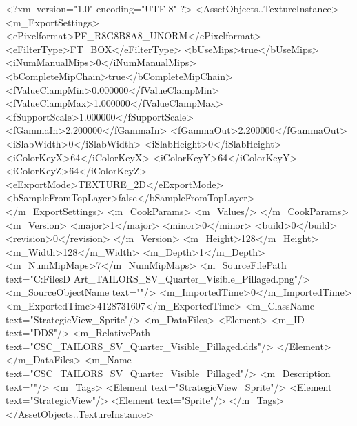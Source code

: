 <?xml version="1.0" encoding="UTF-8" ?>
<AssetObjects..TextureInstance>
	<m_ExportSettings>
		<ePixelformat>PF_R8G8B8A8_UNORM</ePixelformat>
		<eFilterType>FT_BOX</eFilterType>
		<bUseMips>true</bUseMips>
		<iNumManualMips>0</iNumManualMips>
		<bCompleteMipChain>true</bCompleteMipChain>
		<fValueClampMin>0.000000</fValueClampMin>
		<fValueClampMax>1.000000</fValueClampMax>
		<fSupportScale>1.000000</fSupportScale>
		<fGammaIn>2.200000</fGammaIn>
		<fGammaOut>2.200000</fGammaOut>
		<iSlabWidth>0</iSlabWidth>
		<iSlabHeight>0</iSlabHeight>
		<iColorKeyX>64</iColorKeyX>
		<iColorKeyY>64</iColorKeyY>
		<iColorKeyZ>64</iColorKeyZ>
		<eExportMode>TEXTURE_2D</eExportMode>
		<bSampleFromTopLayer>false</bSampleFromTopLayer>
	</m_ExportSettings>
	<m_CookParams>
		<m_Values/>
	</m_CookParams>
	<m_Version>
		<major>1</major>
		<minor>0</minor>
		<build>0</build>
		<revision>0</revision>
	</m_Version>
	<m_Height>128</m_Height>
	<m_Width>128</m_Width>
	<m_Depth>1</m_Depth>
	<m_NumMipMaps>7</m_NumMipMaps>
	<m_SourceFilePath text="C:\Users\Shadow\Desktop\Working Files\2D Art\Quarters\Tailors\StrategicView\CSC_TAILORS_SV_Quarter_Visible_Pillaged.png"/>
	<m_SourceObjectName text=""/>
	<m_ImportedTime>0</m_ImportedTime>
	<m_ExportedTime>4128731607</m_ExportedTime>
	<m_ClassName text="StrategicView_Sprite"/>
	<m_DataFiles>
		<Element>
			<m_ID text="DDS"/>
			<m_RelativePath text="CSC_TAILORS_SV_Quarter_Visible_Pillaged.dds"/>
		</Element>
	</m_DataFiles>
	<m_Name text="CSC_TAILORS_SV_Quarter_Visible_Pillaged"/>
	<m_Description text=""/>
	<m_Tags>
		<Element text="StrategicView_Sprite"/>
		<Element text="StrategicView"/>
		<Element text="Sprite"/>
	</m_Tags>
</AssetObjects..TextureInstance>

